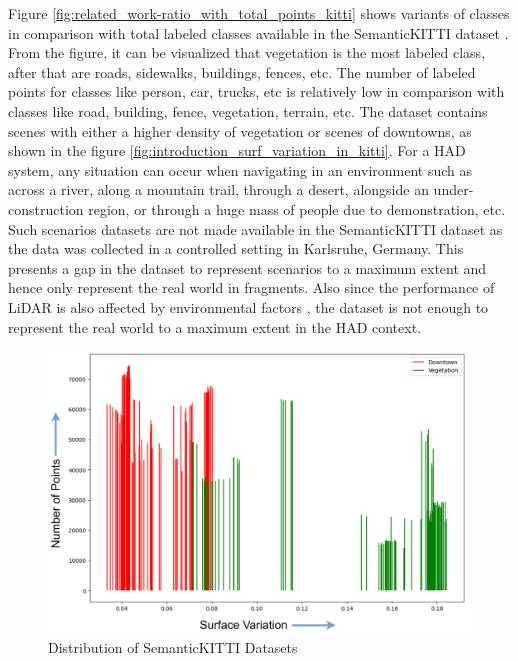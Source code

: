 Figure \ref{fig:related_work-ratio_with_total_points_kitti} shows variants of classes in comparison with total labeled classes available in the SemanticKITTI dataset \parencite{behley2019semantickitti, sem_kitti_total_points_ratio}. From the figure, it can be visualized that vegetation is the most labeled class, after that are roads, sidewalks, buildings, fences, etc. The number of labeled points for classes like person, car, trucks, etc is relatively low in comparison with classes like road, building, fence, vegetation, terrain, etc. The dataset contains scenes with either a higher density of vegetation or scenes of downtowns, as shown in the figure \ref{fig:introduction_surf_variation_in_kitti}. For a HAD system, any situation can occur when navigating in an environment such as across a river, along a mountain trail, through a desert, alongside an under-construction region, or through a huge mass of people due to demonstration, etc. Such scenarios datasets are not made available in the SemanticKITTI dataset as the data was collected in a controlled setting in Karlsruhe, Germany. This presents a gap in the dataset to represent scenarios to a maximum extent and hence only represent the real world in fragments. Also since the performance of LiDAR is also affected by environmental factors \parencite{park2023automotive}, the dataset is not enough to represent the real world to a maximum extent in the HAD context.

\begin{figure}[htb]
    \centering
    \includegraphics[width=1\linewidth]{97_graphics/related_work/downtown_and_vegetation_sv.pdf}
    \caption{Distribution of SemanticKITTI Datasets}
    \label{fig:related_work-downtown_and_vegetation_sv}
\end{figure}

